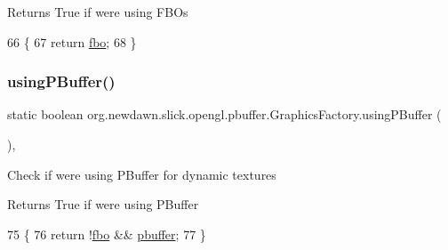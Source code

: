 \begin{DoxyReturn}{Returns}
True if we\textquotesingle{}re using F\+B\+Os 
\end{DoxyReturn}

\begin{DoxyCode}
66                                      \{
67         \textcolor{keywordflow}{return} \mbox{\hyperlink{classorg_1_1newdawn_1_1slick_1_1opengl_1_1pbuffer_1_1_graphics_factory_a9ff71f4ef96ff435c621dcfb206b5bd7}{fbo}};
68     \}
\end{DoxyCode}
\mbox{\label{classorg_1_1newdawn_1_1slick_1_1opengl_1_1pbuffer_1_1_graphics_factory_a42836bb0632b387c81dbf7adb345f03a}} 
\subsubsection{\texorpdfstring{using\+P\+Buffer()}{usingPBuffer()}}
{\footnotesize\ttfamily static boolean org.\+newdawn.\+slick.\+opengl.\+pbuffer.\+Graphics\+Factory.\+using\+P\+Buffer (\begin{DoxyParamCaption}{ }\end{DoxyParamCaption})\hspace{0.3cm}{\ttfamily [inline]}, {\ttfamily [static]}}

Check if we\textquotesingle{}re using P\+Buffer for dynamic textures

\begin{DoxyReturn}{Returns}
True if we\textquotesingle{}re using P\+Buffer 
\end{DoxyReturn}

\begin{DoxyCode}
75                                          \{
76         \textcolor{keywordflow}{return} !\mbox{\hyperlink{classorg_1_1newdawn_1_1slick_1_1opengl_1_1pbuffer_1_1_graphics_factory_a9ff71f4ef96ff435c621dcfb206b5bd7}{fbo}} && \mbox{\hyperlink{classorg_1_1newdawn_1_1slick_1_1opengl_1_1pbuffer_1_1_graphics_factory_a93aabaabb380630168faa85ed5171c54}{pbuffer}};
77     \}
\end{DoxyCode}



